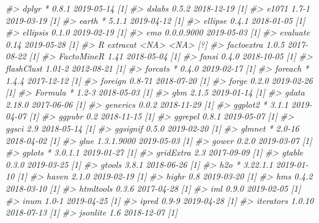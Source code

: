 \documentclass[]{krantz}
\makeatletter
\newenvironment{Shaded}{\begin{snugshade}}{\end{snugshade}}
\newcommand{\CommentTok}[1]{\textcolor[rgb]{0.37,0.37,0.37}{\textit{#1}}}
\newenvironment{kframe}{%
\medskip{}
\setlength{\fboxsep}{.8em}
 \def\at@end@of@kframe{}%
 \ifinner\ifhmode%
  \def\at@end@of@kframe{\end{minipage}}%
  \begin{minipage}{\columnwidth}%
 \fi\fi%
 \def\FrameCommand##1{\hskip\@totalleftmargin \hskip-\fboxsep
 \colorbox{shadecolor}{##1}\hskip-\fboxsep
     \hskip-\linewidth \hskip-\@totalleftmargin \hskip\columnwidth}%
 \MakeFramed {\advance\hsize-\width
   \@totalleftmargin\z@ \linewidth\hsize
   \@setminipage}}%
 {\par\unskip\endMakeFramed%
 \at@end@of@kframe}
\renewenvironment{Shaded}{\begin{kframe}}{\end{kframe}}
\makeatother
\begin{document}
\begin{Shaded}
\begin{Highlighting}[]
\CommentTok{#>    dplyr         * 0.8.1      2019-05-14 [1]}
\CommentTok{#>    dslabs          0.5.2      2018-12-19 [1]}
\CommentTok{#>    e1071           1.7-1      2019-03-19 [1]}
\CommentTok{#>    earth         * 5.1.1      2019-04-12 [1]}
\CommentTok{#>    ellipse         0.4.1      2018-01-05 [1]}
\CommentTok{#>    ellipsis        0.1.0      2019-02-19 [1]}
\CommentTok{#>    emo             0.0.0.9000 2019-05-03 [1]}
\CommentTok{#>    evaluate        0.14       2019-05-28 [1]}
\CommentTok{#>  R extracat        <NA>       <NA>       [?]}
\CommentTok{#>    factoextra      1.0.5      2017-08-22 [1]}
\CommentTok{#>    FactoMineR      1.41       2018-05-04 [1]}
\CommentTok{#>    fansi           0.4.0      2018-10-05 [1]}
\CommentTok{#>    flashClust      1.01-2     2012-08-21 [1]}
\CommentTok{#>    forcats       * 0.4.0      2019-02-17 [1]}
\CommentTok{#>    foreach       * 1.4.4      2017-12-12 [1]}
\CommentTok{#>    foreign         0.8-71     2018-07-20 [1]}
\CommentTok{#>    forge           0.2.0      2019-02-26 [1]}
\CommentTok{#>    Formula       * 1.2-3      2018-05-03 [1]}
\CommentTok{#>    gbm             2.1.5      2019-01-14 [1]}
\CommentTok{#>    gdata           2.18.0     2017-06-06 [1]}
\CommentTok{#>    generics        0.0.2      2018-11-29 [1]}
\CommentTok{#>    ggplot2       * 3.1.1      2019-04-07 [1]}
\CommentTok{#>    ggpubr          0.2        2018-11-15 [1]}
\CommentTok{#>    ggrepel         0.8.1      2019-05-07 [1]}
\CommentTok{#>    ggsci           2.9        2018-05-14 [1]}
\CommentTok{#>    ggsignif        0.5.0      2019-02-20 [1]}
\CommentTok{#>    glmnet        * 2.0-16     2018-04-02 [1]}
\CommentTok{#>    glue            1.3.1.9000 2019-05-03 [1]}
\CommentTok{#>    gower           0.2.0      2019-03-07 [1]}
\CommentTok{#>    gplots        * 3.0.1.1    2019-01-27 [1]}
\CommentTok{#>    gridExtra       2.3        2017-09-09 [1]}
\CommentTok{#>    gtable          0.3.0      2019-03-25 [1]}
\CommentTok{#>    gtools          3.8.1      2018-06-26 [1]}
\CommentTok{#>    h2o           * 3.22.1.1   2019-01-10 [1]}
\CommentTok{#>    haven           2.1.0      2019-02-19 [1]}
\CommentTok{#>    highr           0.8        2019-03-20 [1]}
\CommentTok{#>    hms             0.4.2      2018-03-10 [1]}
\CommentTok{#>    htmltools       0.3.6      2017-04-28 [1]}
\CommentTok{#>    iml             0.9.0      2019-02-05 [1]}
\CommentTok{#>    inum            1.0-1      2019-04-25 [1]}
\CommentTok{#>    ipred           0.9-9      2019-04-28 [1]}
\CommentTok{#>    iterators       1.0.10     2018-07-13 [1]}
\CommentTok{#>    jsonlite        1.6        2018-12-07 [1]}

\end{Highlighting}
\end{Shaded}
\end{document}

